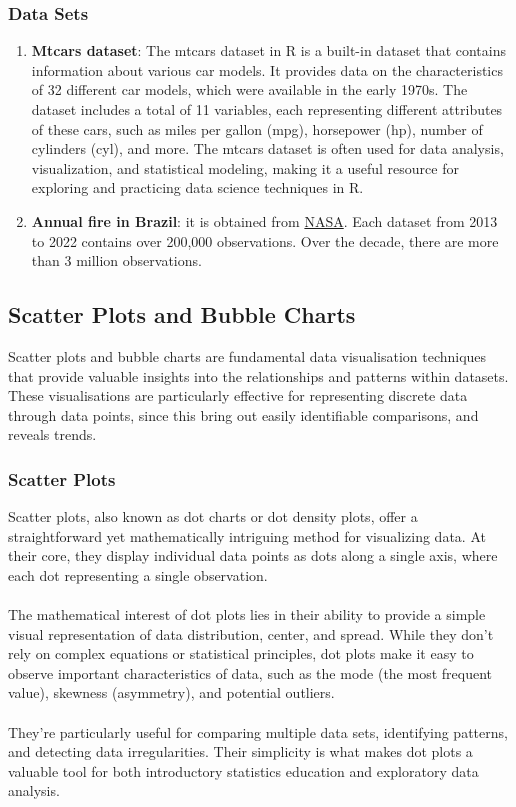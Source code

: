 \documentclass{article}\usepackage[]{graphicx}\usepackage[]{xcolor}
\begin{document}
\subsubsection{Data Sets}
\begin{enumerate}
\item \textbf{Mtcars dataset}: The mtcars dataset in R is a built-in dataset that contains information about various car models. It provides data on the characteristics of 32 different car models, which were available in the early 1970s. The dataset includes a total of 11 variables, each representing different attributes of these cars, such as miles per gallon (mpg), horsepower (hp), number of cylinders (cyl), and more. The mtcars dataset is often used for data analysis, visualization, and statistical modeling, making it a useful resource for exploring and practicing data science techniques in R.\\
\item \textbf{Annual fire in Brazil}: it is obtained from \href{https://firms.modaps.eosdis.nasa.gov/}{NASA}. Each dataset from 2013 to 2022 contains over 200,000 observations. Over the decade, there are more than 3 million observations.\\
\end{enumerate}

\subsection{Scatter Plots and Bubble Charts}
Scatter plots and bubble charts are fundamental data visualisation techniques that provide valuable insights into the relationships and patterns within datasets. These visualisations are particularly effective for representing discrete data through data points, since this bring out easily identifiable comparisons, and reveals trends.

\subsubsection{Scatter Plots}
Scatter plots, also known as dot charts or dot density plots, offer a straightforward yet mathematically intriguing method for visualizing data. At their core, they display individual data points as dots along a single axis, where each dot representing a single observation.\\ 
\\The mathematical interest of dot plots lies in their ability to provide a simple visual representation of data distribution, center, and spread. While they don't rely on complex equations or statistical principles, dot plots make it easy to observe important characteristics of data, such as the mode (the most frequent value), skewness (asymmetry), and potential outliers. \\ 
\\They're particularly useful for comparing multiple data sets, identifying patterns, and detecting data irregularities. Their simplicity is what makes dot plots a valuable tool for both introductory statistics education and exploratory data analysis.
\end{document}
